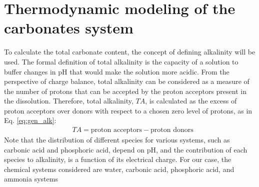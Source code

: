 \documentclass[10pt,a4paper]{article}
\begin{document}
\section{Thermodynamic modeling of the carbonates system} \label{Carbonates}
To calculate the total carbonate content, the concept of defining alkalinity will be used. The formal definition of total alkalinity is the capacity of a solution to buffer changes in pH that would make the solution more acidic.
From the perspective of charge balance, total alkalinity can be considered as a measure of the number of protons that can be accepted by the proton acceptors present in the dissolution. Therefore, total alkalinity, $TA$, is calculated as the excess of proton acceptors over donors with respect to a chosen zero level of protons, as in Eq. \ref{eq:gen_alk}:
\begin{align} 
& TA = \text{proton acceptors} - \text{proton donors} \label{eq:gen_alk}
\end{align}
Note that the distribution of different species for various systems, such as carbonic acid and phosphoric acid, depend on pH, and the contribution of each species to alkalinity, is a function of its electrical charge. For our case, the chemical systems considered are water, carbonic acid, phosphoric acid, and ammonia systems
\end{document}
